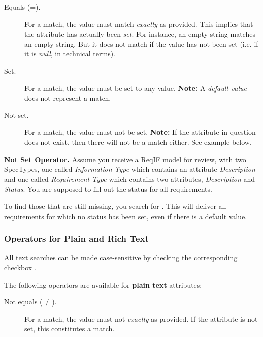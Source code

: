 \begin{description}
\item[Equals (=).] For a match, the value must match \textit{exactly} as provided.  This implies that the attribute has actually been \textit{set}.  For instance, an empty string matches an empty string.  But it does not match if the value has not been set (i.e. if it is \textit{null}, in technical terms).
\item[Set.] For a match, the value must be set to any value. \textbf{Note:} A \textit{default value} does not represent a match.
\item[Not set.] For a match, the value must not be set. \textbf{Note:} If the attribute in question does not exist, then there will not be a match either.  See example below.
\end{description}

\begin{example}
\textbf{Not Set Operator.}
Assume you receive a ReqIF model for review, with two SpecTypes, one called \textit{Information Type} which contains an attribute \textit{Description} and one called \textit{Requirement Type} which contains two attributes, \textit{Description} and \textit{Status}.  You are supposed to fill out the status for all requirements.

To find those that are still missing, you search for  .  This will deliver all requirements for which no status has been set, even if there is a default value.
\end{example}

\subsubsection{Operators for Plain and Rich Text}

All text searches can be made case-sensitive by checking the corresponding checkbox .

The following operators are available for \textbf{plain text} attributes:

\begin{description}
\item[Not equals ($\neq$).] For a match, the value must not \textit{exactly} as provided.  If the attribute is not set, this constitutes a match.
\end{description}

